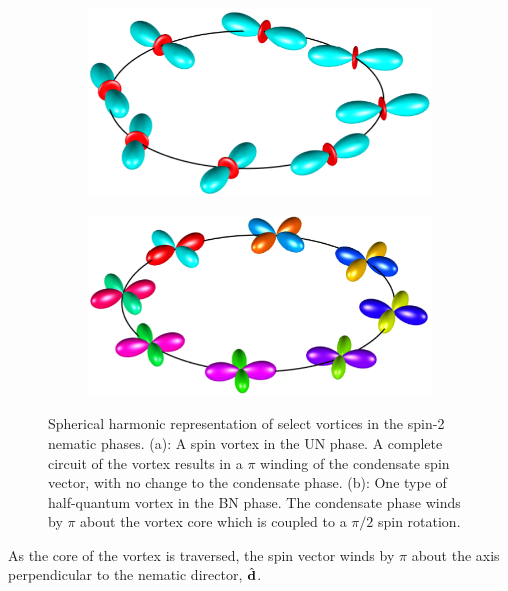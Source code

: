 \begin{figure}
    \centering
    \begin{subfigure}{0.49\textwidth}
        \includegraphics[width=\textwidth]
        {gfx/ch-groundStateSymmetries/UN-spin-vortex.pdf}
        \caption{\label{subfig: UN-spin-vortex}}
    \end{subfigure}
    \begin{subfigure}{0.49\textwidth}
        \includegraphics[width=\textwidth]
        {gfx/ch-groundStateSymmetries/BN-HQV.pdf}
        \caption{\label{subfig: BN-HQV}}
    \end{subfigure}
    \caption[Spherical harmonic representation of spin-2 vortices]
    {Spherical harmonic representation of select vortices in the spin-2
        nematic phases.
        (a): A spin vortex in the UN phase. A complete circuit of the vortex
        results in a \(\pi \) winding of the condensate spin vector, with no
        change to the condensate phase.
        (b): One type of half-quantum vortex in the BN phase.
        The condensate phase winds by \(\pi \) about the vortex core which is
        coupled to a \(\pi / 2\) spin rotation.}
\end{figure}
As the core of the vortex is traversed, the spin vector winds by \(\pi \) about
the axis perpendicular to the nematic director, \(\hat{\vb{d}}\).

